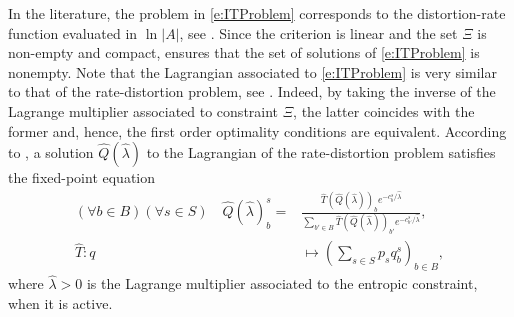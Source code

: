 \documentclass[smallextended,referee,envcountsect,]{svjour3}
\begin{document}
{In the literature, the problem in \eqref{e:ITProblem} corresponds 
to the distortion-rate function evaluated in $\ln |A|$, see 
{\cite[Equation (10.160)]{cover-book-2006}}. Since the criterion 
is linear and the set $\Xi$ is non-empty and compact, 
\cite[Theorem~2.12]{Beck2017} ensures that the set of solutions of 
\eqref{e:ITProblem} is nonempty. Note that the Lagrangian 
associated to \eqref{e:ITProblem} is very similar to that of
the rate-distortion problem, see \cite[Equation 
(8.2)]{CsiszarKorner(Book)11}. Indeed, by taking the inverse 
of the Lagrange multiplier associated to constraint $\Xi$, the latter 
coincides with the former and, hence, the first order optimality 
conditions are equivalent.
According to \cite[Lemma~8.5 \& 
Corollary~8.5]{CsiszarKorner(Book)11}, a solution 
$\widehat{Q}(\widehat{\lambda})$ to the Lagrangian of the 
rate-distortion problem
satisfies the fixed-point equation
\begin{align}
\label{e:defQhat}
(\forall b\in B)(\forall s\in S)\quad 
\widehat{Q}(\widehat{\lambda})_b^s
=&\frac{\widehat{T}(\widehat{Q}(\widehat{\lambda}))_b 
e^{-c_{b}^s/{\widehat{\lambda}}
}}{\sum\limits_{b'\in B}\widehat{T}(\widehat{Q}(\widehat{\lambda}))_{b'}
e^{- c_{b'}^s/{\widehat{\lambda}} } },\\
\widehat{T}\colon q&\mapsto \left(\sum_{s\in S} p_s 
q_b^s\right)_{b\in B},
\end{align}
where $\widehat{\lambda}>0$ is the Lagrange multiplier associated 
to the entropic constraint, when it is active. 

}
\end{document}
